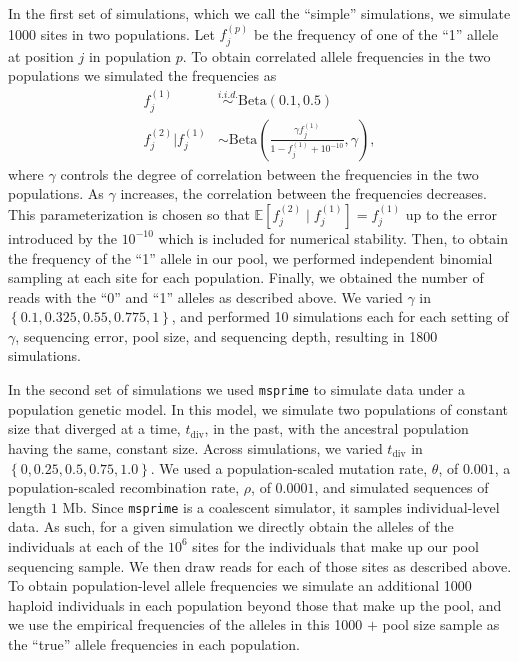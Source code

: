 \documentclass[a4paper,fontsize=9pt,DIV=14]{scrartcl}
\begin{document}
In the first set of simulations, which we call the ``simple'' simulations, we simulate 1000 sites in two populations.  Let $f_j^{(p)}$ be the frequency of one of the ``1'' allele at position $j$ in population $p$.  To obtain correlated allele frequencies in the two populations we simulated the frequencies as
\begin{align*}
f_j^{(1)} &\overset{i.i.d.}{\sim} \text{Beta}(0.1, 0.5) \\
f_j^{(2)} | f_j^{(1)} &\sim \text{Beta}\left(\frac{\gamma f^{(1)}_j}{1-f^{(1)}_j+10^{-10}}, \gamma\right),
\end{align*}
where $\gamma$ controls the degree of correlation between the frequencies in the two populations.  As $\gamma$ increases, the correlation between the frequencies decreases.  This parameterization is chosen so that $\mathbb{E}\left[f_j^{(2)} \mid f_j^{(1)}\right] = f_j^{(1)}$ up to the error introduced by the $10^{-10}$ which is included for numerical stability.  Then, to obtain the frequency of the ``1'' allele in our pool, we performed independent binomial sampling at each site for each population.  Finally, we obtained the number of reads with the ``0'' and ``1'' alleles as described above.  We varied $\gamma$ in $\left\{0.1, 0.325, 0.55, 0.775, 1\right\}$, and performed 10 simulations each for each setting of $\gamma$, sequencing error, pool size, and sequencing depth, resulting in 1800 simulations.

In the second set of simulations we used \texttt{msprime} \citep{baumdicker2022efficient,kelleher2016efficient} to simulate data under a population genetic model.  In this model, we simulate two populations of constant size that diverged at a time, $t_\text{div}$, in the past, with the ancestral population having the same, constant size.  Across simulations, we varied $t_\text{div}$ in $\left\{0, 0.25, 0.5, 0.75, 1.0\right\}$.  We used a population-scaled mutation rate, $\theta$, of $0.001$, a population-scaled recombination rate, $\rho$, of $0.0001$, and simulated sequences of length $1$ Mb.  Since \texttt{msprime} is a coalescent simulator, it samples individual-level data.  As such, for a given simulation we directly obtain the alleles of the individuals at each of the $10^6$ sites for the individuals that make up our pool sequencing sample.  We then draw reads for each of those sites as described above.  To obtain population-level allele frequencies we simulate an additional 1000 haploid individuals in each population beyond those that make up the pool, and we use the empirical frequencies of the alleles in this 1000 $+$ pool size sample as the ``true'' allele frequencies in each population.
\end{document}

